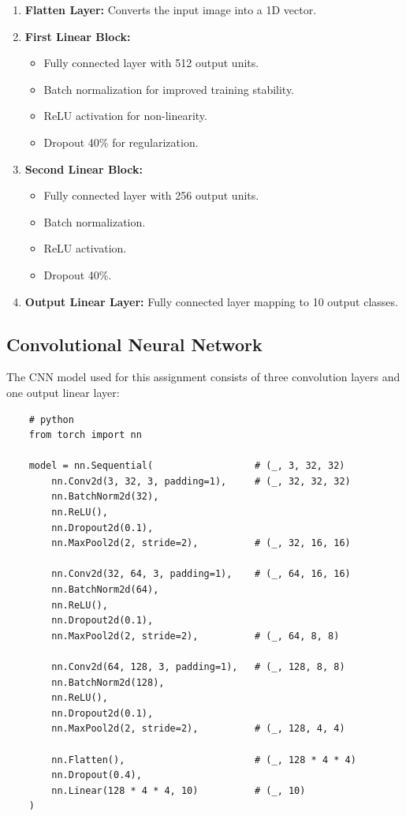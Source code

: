 \documentclass{report}
\begin{document}
\begin{enumerate}
    \item \textbf{Flatten Layer:} Converts the input image into a 1D vector.
    \item \textbf{First Linear Block:}
    \begin{itemize}
        \item Fully connected layer with 512 output units.
        \item Batch normalization for improved training stability.
        \item ReLU activation for non-linearity.
        \item Dropout 40\% for regularization.
    \end{itemize}
    \item \textbf{Second Linear Block:}
    \begin{itemize}
        \item Fully connected layer with 256 output units.
        \item Batch normalization.
        \item ReLU activation.
        \item Dropout 40\%.
    \end{itemize}
    \item \textbf{Output Linear Layer:} Fully connected layer mapping to 10 output classes.
\end{enumerate}

\subsection{Convolutional Neural Network}
The CNN model used for this assignment consists of three convolution layers and one output linear layer:

\begin{verbatim}
    # python
    from torch import nn

    model = nn.Sequential(                  # (_, 3, 32, 32)
        nn.Conv2d(3, 32, 3, padding=1),     # (_, 32, 32, 32)
        nn.BatchNorm2d(32),
        nn.ReLU(),
        nn.Dropout2d(0.1),
        nn.MaxPool2d(2, stride=2),          # (_, 32, 16, 16)

        nn.Conv2d(32, 64, 3, padding=1),    # (_, 64, 16, 16)
        nn.BatchNorm2d(64),
        nn.ReLU(),
        nn.Dropout2d(0.1),
        nn.MaxPool2d(2, stride=2),          # (_, 64, 8, 8)

        nn.Conv2d(64, 128, 3, padding=1),   # (_, 128, 8, 8)
        nn.BatchNorm2d(128),
        nn.ReLU(),
        nn.Dropout2d(0.1),
        nn.MaxPool2d(2, stride=2),          # (_, 128, 4, 4)

        nn.Flatten(),                       # (_, 128 * 4 * 4)
        nn.Dropout(0.4),
        nn.Linear(128 * 4 * 4, 10)          # (_, 10)
    )
\end{verbatim}
\end{document}
